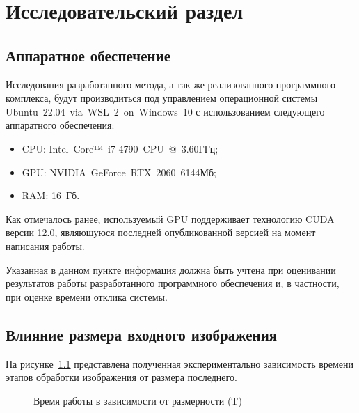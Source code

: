 \chapter{Исследовательский раздел}

\section{Аппаратное обеспечение}

Исследования разработанного метода, а так же реализованного программного комплекса, будут производиться под управлением операционной системы Ubuntu~22.04~via~WSL~2~on~Windows~10 с использованием следующего аппаратного обеспечения:
\begin{itemize}[label=---]
    \item CPU: Intel~Core™~i7-4790~CPU~@~3.60ГГц;
    \item GPU: NVIDIA~GeForce~RTX~2060~6144Мб;
    \item RAM: 16~Гб.
\end{itemize}

Как отмечалось ранее, используемый GPU поддерживает технологию CUDA версии 12.0, являюшуюся последней опубликованной версией на момент написания работы.

Указанная в данном пункте информация должна быть учтена при оценивании результатов работы разработанного программного обеспечения и, в частности, при оценке времени отклика системы.

\section{Влияние размера входного изображения}

На рисунке~\ref{plt:steps-timing} представлена полученная экспериментально зависимость времени этапов обработки изображения от размера последнего.

\begin{figure}[htp]
	\centering
	\captionsetup{justification=centering}
	\caption{Время работы в зависимости от размерности (T)}
	\label{plt:steps-timing}
\end{figure}

